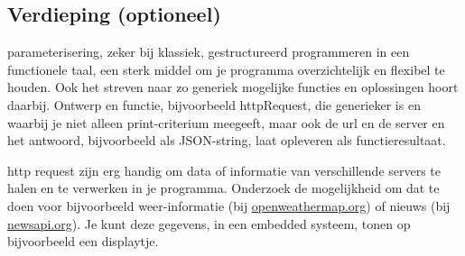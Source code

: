 \subsection{Verdieping (optioneel)}
\begin{exercise}
parameterisering, zeker bij klassiek, gestructureerd programmeren in een functionele taal, een sterk middel om je programma overzichtelijk en flexibel te houden. Ook het streven naar zo generiek mogelijke functies en oplossingen hoort daarbij. Ontwerp en functie, bijvoorbeeld httpRequest, die generieker is en waarbij je niet alleen print-criterium meegeeft, maar ook de url en de server en het antwoord, bijvoorbeeld als JSON-string, laat opleveren als functieresultaat.
\end{exercise}

\begin{exercise}
  http request zijn erg handig om data of informatie van verschillende servers te halen en te verwerken in je programma. Onderzoek de mogelijkheid om dat te doen voor bijvoorbeeld weer-informatie (bij \url{openweathermap.org}) of nieuws (bij \url{newsapi.org}). Je kunt deze gegevens, in een embedded systeem, tonen op bijvoorbeeld een displaytje.
\end{exercise}

